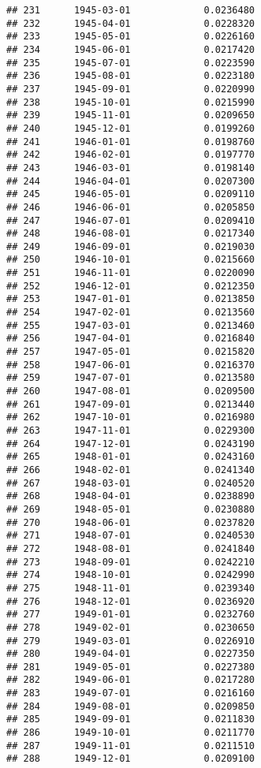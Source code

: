 \documentclass[
]{article}
\begin{document}
\begin{verbatim}
## 231      1945-03-01             0.0236480
## 232      1945-04-01             0.0228320
## 233      1945-05-01             0.0226160
## 234      1945-06-01             0.0217420
## 235      1945-07-01             0.0223590
## 236      1945-08-01             0.0223180
## 237      1945-09-01             0.0220990
## 238      1945-10-01             0.0215990
## 239      1945-11-01             0.0209650
## 240      1945-12-01             0.0199260
## 241      1946-01-01             0.0198760
## 242      1946-02-01             0.0197770
## 243      1946-03-01             0.0198140
## 244      1946-04-01             0.0207300
## 245      1946-05-01             0.0209110
## 246      1946-06-01             0.0205850
## 247      1946-07-01             0.0209410
## 248      1946-08-01             0.0217340
## 249      1946-09-01             0.0219030
## 250      1946-10-01             0.0215660
## 251      1946-11-01             0.0220090
## 252      1946-12-01             0.0212350
## 253      1947-01-01             0.0213850
## 254      1947-02-01             0.0213560
## 255      1947-03-01             0.0213460
## 256      1947-04-01             0.0216840
## 257      1947-05-01             0.0215820
## 258      1947-06-01             0.0216370
## 259      1947-07-01             0.0213580
## 260      1947-08-01             0.0209500
## 261      1947-09-01             0.0213440
## 262      1947-10-01             0.0216980
## 263      1947-11-01             0.0229300
## 264      1947-12-01             0.0243190
## 265      1948-01-01             0.0243160
## 266      1948-02-01             0.0241340
## 267      1948-03-01             0.0240520
## 268      1948-04-01             0.0238890
## 269      1948-05-01             0.0230880
## 270      1948-06-01             0.0237820
## 271      1948-07-01             0.0240530
## 272      1948-08-01             0.0241840
## 273      1948-09-01             0.0242210
## 274      1948-10-01             0.0242990
## 275      1948-11-01             0.0239340
## 276      1948-12-01             0.0236920
## 277      1949-01-01             0.0232760
## 278      1949-02-01             0.0230650
## 279      1949-03-01             0.0226910
## 280      1949-04-01             0.0227350
## 281      1949-05-01             0.0227380
## 282      1949-06-01             0.0217280
## 283      1949-07-01             0.0216160
## 284      1949-08-01             0.0209850
## 285      1949-09-01             0.0211830
## 286      1949-10-01             0.0211770
## 287      1949-11-01             0.0211510
## 288      1949-12-01             0.0209100

\end{verbatim}
\end{document}
